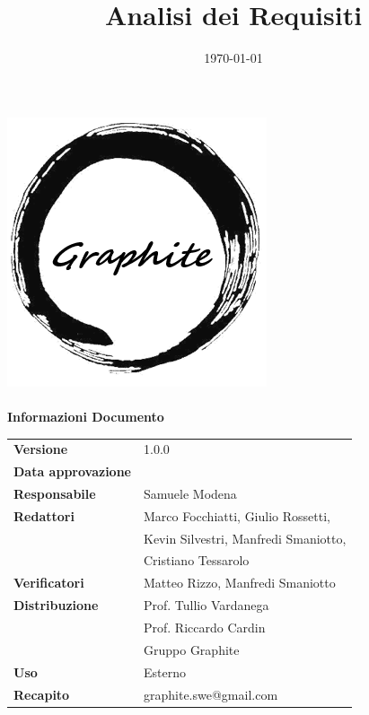 \documentclass[openany,12pt,a4paper]{report}
\title{Analisi dei Requisiti}
\author{}
\date{\today}
\begin{document}
	\makeatletter
	\begin{titlepage}
		\setlength{\headsep}{0pt}  
		\begin{center}			
			\includegraphics[width=0.5\linewidth]{Logo.png}\\[1em]
			{\huge \bfseries  \@title }\\[10ex]
			\textbf{\Large Informazioni Documento} \\[2em]
			\bgroup
			\def\arraystretch{1.5}
			\begin{tabular}{l|l}
				\textbf{Versione} & 1.0.0 \\
				\textbf{Data approvazione} & \large \@date \\
				\textbf{Responsabile} & Samuele Modena \\
				\textbf{Redattori} & Marco Focchiatti, Giulio Rossetti,\\
				& Kevin Silvestri, Manfredi Smaniotto,\\
				& Cristiano Tessarolo \\
				\textbf{Verificatori} & Matteo Rizzo, Manfredi Smaniotto \\
				\textbf{Distribuzione} & Prof. Tullio Vardanega \\
				 & Prof. Riccardo Cardin \\
				 & Gruppo Graphite \\
				\textbf{Uso} & Esterno \\
				\textbf{Recapito} & graphite.swe@gmail.com \\
			\end{tabular}
		\egroup
		\end{center}
	\end{titlepage}
	\makeatother

	\thispagestyle{empty}
	\newpage
	
	
	
	\tableofcontents
	
	
	
	
	
	
	
\end{document}
